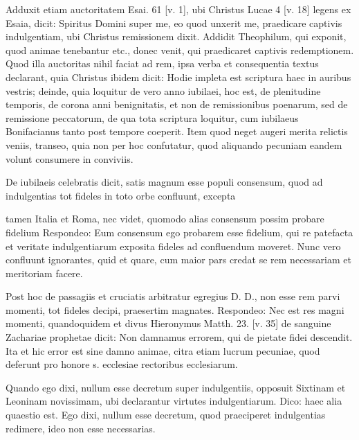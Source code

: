 Adduxit etiam auctoritatem Esai. 61 [v. 1], ubi Christus Lucae 4 [v. 18] legens ex Esaia, dicit: Spiritus Domini super me, eo quod unxerit me, praedicare captivis indulgentiam, ubi Christus remissionem dixit. Addidit Theophilum, qui exponit, quod animae tenebantur etc., donec venit, qui praedicaret captivis redemptionem. Quod illa auctoritas nihil faciat ad rem, ipsa verba et consequentia textus declarant, quia Christus ibidem dicit: Hodie impleta est scriptura haec in auribus vestris; deinde, quia loquitur de vero anno iubilaei, hoc est, de plenitudine temporis, de corona anni benignitatis, et non de remissionibus poenarum, sed de remissione peccatorum, de qua tota scriptura loquitur, cum iubilaeus Bonifacianus tanto post tempore coeperit. Item quod neget augeri merita relictis veniis, transeo, quia non per hoc confutatur, quod aliquando pecuniam eandem volunt consumere in conviviis.

De iubilaeis celebratis dicit, satis magnum esse populi consensum, quod ad indulgentias tot fideles in toto orbe confluunt, excepta

tamen Italia et Roma, nec videt, quomodo alias consensum possim probare fidelium Respondeo: Eum consensum ego probarem esse fidelium, qui re patefacta et veritate indulgentiarum exposita fideles ad confluendum moveret. Nunc vero confluunt ignorantes, quid et quare, cum maior pars credat se rem necessariam et meritoriam facere.

Post hoc de passagiis et cruciatis arbitratur egregius D. D., non esse rem parvi momenti, tot fideles decipi, praesertim magnates. Respondeo: Nec est res magni momenti, quandoquidem et divus Hieronymus Matth. 23. [v. 35] de sanguine Zachariae prophetae dicit: Non damnamus errorem, qui de pietate fidei descendit. Ita et hic error est sine damno animae, citra etiam lucrum pecuniae, quod deferunt pro honore s. ecclesiae rectoribus ecclesiarum.

Quando ego dixi, nullum esse decretum super indulgentiis, opposuit Sixtinam et Leoninam novissimam, ubi declarantur virtutes indulgentiarum. Dico: haec alia quaestio est. Ego dixi, nullum esse decretum, quod praeciperet indulgentias redimere, ideo non esse necessarias.

